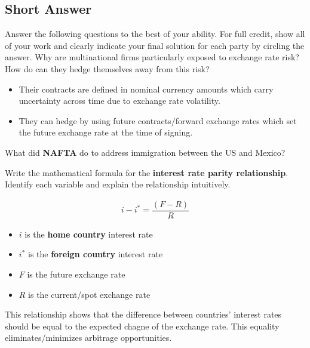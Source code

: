 \documentclass[12pt]{exam}
\begin{document}
\begin{questions}
\newpage
\section*{Short Answer}
Answer the following questions to the best of your ability.
For full credit, show all of your work and clearly indicate your final solution for each party by circling the answer.
\question[5]
Why are multinational firms particularly exposed to exchange rate risk?
How do can they hedge themselves away from this risk?
\begin{solution}
    \begin{itemize}
        \item Their contracts are defined in nominal currency amounts which carry uncertainty across time due to exchange rate volatility.
        \item They can hedge by using future contracts/forward exchange rates which set the future exchange rate at the time of signing.
    \end{itemize}
\end{solution}
\question[5] 
What did \textbf{NAFTA} do to address immigration between the US and Mexico?

\begin{solution}
    
\end{solution}

\question[5]
Write the mathematical formula for the \textbf{interest rate parity relationship}.
Identify each variable and explain the relationship intuitively.
\begin{solution}
    \begin{align*}
        i - i^{*} = \dfrac{(F - R)}{R}
    \end{align*}
    \begin{itemize}
        \item $i$ is the \textbf{home country} interest rate
        \item $i^{*}$ is the \textbf{foreign country} interest rate
        \item $F$ is the future exchange rate
        \item $R$ is the current/spot exchange rate
    \end{itemize}
    This relationship shows that the difference between countries' interest rates should be equal to the expected chagne of the exchange rate. 
    This equality eliminates/minimizes arbitrage opportunities.
\end{solution}


\end{questions}
\end{document}
